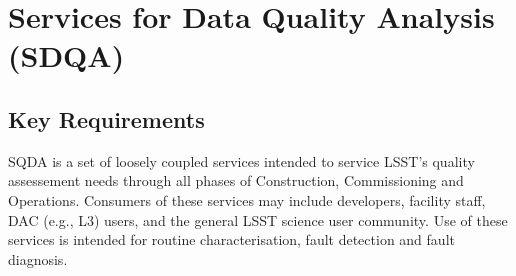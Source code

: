 \section{Services for Data Quality Analysis (SDQA)}
\label{sec:sdqa}

\subsection{Key Requirements}

SQDA is a set of loosely coupled services intended to service LSST's quality assessement needs through all phases of Construction, Commissioning and Operations. Consumers of these services may include developers, facility staff, DAC (e.g., L3) users, and the general LSST science user community. Use of these services is intended for routine characterisation, fault detection and fault diagnosis.

